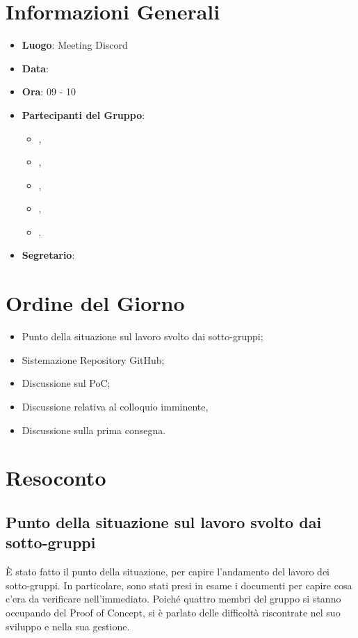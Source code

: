 \section{Informazioni Generali}

\begin{itemize}
\item{\textbf{Luogo}}: Meeting Discord
\item{\textbf{Data}}: \D{}
\item{\textbf{Ora}}: 09 - 10
\item{\textbf{Partecipanti del Gruppo}}: 
	\begin{itemize}
	\item{\EP{},} 
	\item{\FP{},}
	\item{\GC{},}
	\item{\LW{},}
	\item{\MB{}.}
	\end{itemize} 
\item{\textbf{Segretario}}: \GC{}	
\end{itemize}

\section{Ordine del Giorno}
\begin{itemize}
\item{Punto della situazione sul lavoro svolto dai sotto-gruppi;}
\item{Sistemazione Repository GitHub;}
\item{Discussione sul PoC;}
\item{Discussione relativa al colloquio imminente,}
\item{Discussione sulla prima consegna.}
\end{itemize}

\section{Resoconto}

\subsection{Punto della situazione sul lavoro svolto dai sotto-gruppi}

È stato fatto il punto della situazione, per capire l'andamento del lavoro dei sotto-gruppi. In particolare, sono stati presi in esame i documenti per capire cosa c'era da verificare nell'immediato.
Poiché quattro membri del gruppo si stanno occupando del Proof of Concept, si è parlato delle difficoltà riscontrate nel suo sviluppo e nella sua gestione.     

